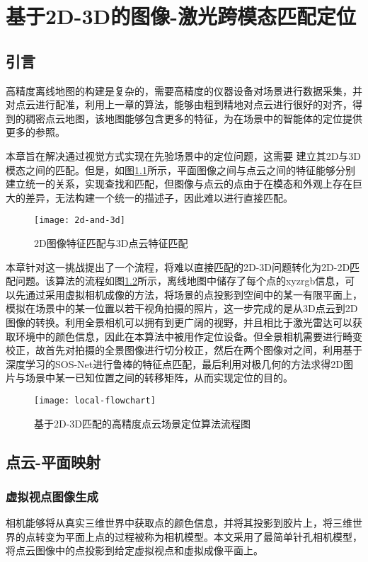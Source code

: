 
\chapter{基于2D-3D的图像-激光跨模态匹配定位}
\label{ch4}
\section{引言}
高精度离线地图的构建是复杂的，需要高精度的仪器设备对场景进行数据采集，并对点云进行配准，利用上一章的算法，能够由粗到精地对点云进行很好的对齐，得到的稠密点云地图，该地图能够包含更多的特征，为在场景中的智能体的定位提供更多的参照。

本章旨在解决通过视觉方式实现在先验场景中的定位问题，这需要
建立其2D与3D模态之间的匹配。但是，如图\ref{2d-and-3d}所示，平面图像之间与点云之间的特征能够分别建立统一的关系，实现查找和匹配，但图像与点云的点由于在模态和外观上存在巨大的差异，无法构建一个统一的描述子，因此难以进行直接匹配\cite{piasco2018survey}。
\begin{figure}
	\centering
	\texttt{[image: 2d-and-3d]}
	\caption{2D图像特征匹配与3D点云特征匹配}
	\label{2d-and-3d}
\end{figure}

本章针对这一挑战提出了一个流程，将难以直接匹配的2D-3D问题转化为2D-2D匹配问题。该算法的流程如图\ref{local-flowchart}所示，离线地图中储存了每个点的xyzrgb信息，可以先通过采用虚拟相机成像的方法，将场景的点投影到空间中的某一有限平面上，模拟在场景中的某一位置以若干视角拍摄的照片，这一步完成的是从3D点云到2D图像的转换。利用全景相机可以拥有到更广阔的视野，并且相比于激光雷达可以获取环境中的颜色信息，因此在本算法中被用作定位设备。但全景相机需要进行畸变校正，故首先对拍摄的全景图像进行切分校正，然后在两个图像对之间，利用基于深度学习的SOS-Net\cite{tian2019sosnet}进行鲁棒的特征点匹配，最后利用对极几何的方法求得2D图片与场景中某一已知位置之间的转移矩阵，从而实现定位的目的。
\begin{figure}
	\centering
	\texttt{[image: local-flowchart]}
	\caption{基于2D-3D匹配的高精度点云场景定位算法流程图}
	\label{local-flowchart}
\end{figure}

\section{点云-平面映射}
\label{point-cloud-to-plane}
\subsection{虚拟视点图像生成}
相机能够将从真实三维世界中获取点的颜色信息，并将其投影到胶片上，将三维世界的点转变为平面上点的过程被称为相机模型。本文采用了最简单针孔相机模型，将点云图像中的点投影到给定虚拟视点和虚拟成像平面上。

